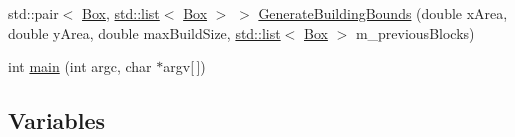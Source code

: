 \begin{DoxyCompactItemize}
\item 
std\+::pair$<$ \hyperlink{classns3_1_1Box}{Box}, \hyperlink{openflow-interface_8h_afd9bcfa176617760671b67580f536fa7}{std\+::list}$<$ \hyperlink{classns3_1_1Box}{Box} $>$ $>$ \hyperlink{mc-twoenbs_8cc_a44ed24f55f9249a5cb23a36d126def78}{Generate\+Building\+Bounds} (double x\+Area, double y\+Area, double max\+Build\+Size, \hyperlink{openflow-interface_8h_afd9bcfa176617760671b67580f536fa7}{std\+::list}$<$ \hyperlink{classns3_1_1Box}{Box} $>$ m\+\_\+previous\+Blocks)
\item 
int \hyperlink{mc-twoenbs_8cc_a0ddf1224851353fc92bfbff6f499fa97}{main} (int argc, char $\ast$argv\mbox{[}$\,$\mbox{]})
\end{DoxyCompactItemize}
\subsection*{Variables}
